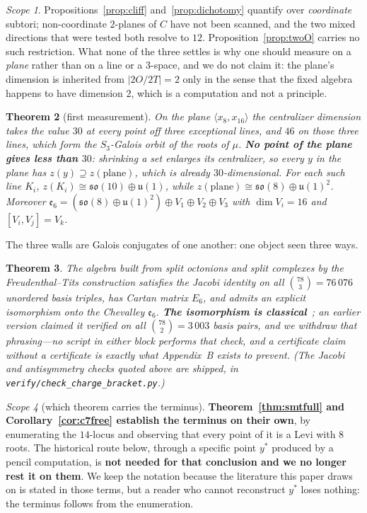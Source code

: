 \documentclass[11pt,reqno]{amsart}
\theoremstyle{plain}
\newtheorem{theorem}{Theorem}[section]
\theoremstyle{definition}
\theoremstyle{remark}
\newtheorem{scope}[theorem]{Scope}
\newcommand{\so}{\mathfrak{so}}
\newcommand{\uu}{\mathfrak{u}}
\newcommand{\ee}{\mathfrak{e}}
\newcommand{\fn}[1]{\texttt{\small #1}}
\begin{document}
\begin{scope}\label{sc:cliffscope}
Propositions~\ref{prop:cliff} and~\ref{prop:dichotomy} quantify over \emph{coordinate}
subtori; non-coordinate $2$-planes of $C$ have not been scanned, and the two mixed
directions that were tested both resolve to $12$. Proposition~\ref{prop:twoO} carries no
such restriction. What none of the three settles is why one should measure on a
\emph{plane} rather than on a line or a $3$-space, and we do not claim it: the plane's
dimension is inherited from $\lvert 2O/2T\rvert=2$ only in the sense that the fixed
algebra happens to have dimension $2$, which is a computation and not a principle.
\end{scope}

\begin{theorem}[first measurement]\label{thm:fmt}
On the plane $\langle x_8,x_{16}\rangle$ the centralizer dimension takes the value $30$
at every point off three exceptional lines, and $46$ on those three lines, which form
the $S_3$-Galois orbit of the roots of $\mu$. \textbf{No point of the plane gives less
than $30$}: shrinking a set enlarges its centralizer, so every $y$ in the plane has
$z(y)\supseteq z(\text{plane})$, which is already $30$-dimensional. For each such line $K_i$, $z(K_i)\cong\so(10)\oplus\uu(1)$, while
$z(\text{plane})\cong\so(8)\oplus\uu(1)^2$. Moreover
$\ee_6=(\so(8)\oplus\uu(1)^2)\oplus V_1\oplus V_2\oplus V_3$ with $\dim V_i=16$ and
$[V_i,V_j]=V_k$.
\end{theorem}

The three walls are Galois conjugates of one another: one object seen three ways.

\begin{theorem}\label{thm:magic}
The algebra built from split octonions and split complexes by the Freudenthal--Tits
construction satisfies the Jacobi identity on all $\binom{78}{3}=76\,076$ unordered
basis triples, has Cartan matrix $E_6$, and admits an explicit isomorphism onto the
Chevalley $\ee_6$. \textbf{The isomorphism is classical}~\cite{BartonSudbery};
an earlier version claimed it \emph{verified on all} $\binom{78}{2}=3\,003$ basis pairs,
and we withdraw that phrasing---no script in either block performs that check, and a
certificate claim without a certificate is exactly what Appendix~B exists to prevent.
(The Jacobi and antisymmetry checks quoted above \emph{are} shipped, in
\fn{verify/check\_\allowbreak charge\_\allowbreak bracket.py}.)
\end{theorem}

\begin{scope}[which theorem carries the terminus]\label{sc:whichthm}
\textbf{Theorem~\ref{thm:smtfull} and Corollary~\ref{cor:c7free} establish the terminus
on their own}, by enumerating the $14$-locus and observing that every point of it is a
Levi with $8$ roots. The historical route below, through a specific point $y^*$ produced
by a pencil computation, is \textbf{not needed for that conclusion and we no longer rest
it on them}. We keep the notation because the literature this paper draws on is stated
in those terms, but a reader who cannot reconstruct $y^*$ loses nothing: the terminus
follows from the enumeration.
\end{scope}
\end{document}
